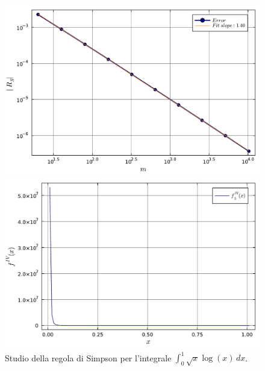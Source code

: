 \documentclass[letterpaper, 12pt]{article}
\begin{document}
\begin{figure}[!ht]
    \centering
    \begin{minipage}[b]{0.47\textwidth}
        \includegraphics[width=\textwidth]{5145.pdf}
    \end{minipage}
    \hspace{0.5cm}
    \begin{minipage}[b]{0.47\textwidth}
        \includegraphics[width=\textwidth]{5145_2.pdf}
    \end{minipage}
    \caption{Studio della regola di Simpson per l'integrale $\int_0^1 \sqrt{x} \log(x) \, dx$.}
    \label{fig:es5_1_4_5}
\end{figure}
\end{document}
